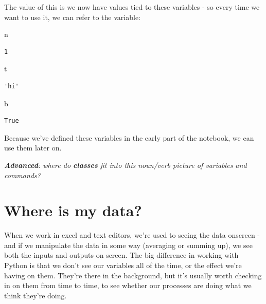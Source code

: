 \documentclass[
  letterpaper,
  DIV=11,
  numbers=noendperiod]{scrreprt}
\newenvironment{Shaded}{\begin{snugshade}}{\end{snugshade}}
\newcommand{\NormalTok}[1]{\textcolor[rgb]{0.00,0.23,0.31}{#1}}
\begin{document}
The value of this is we now have values tied to these variables - so
every time we want to use it, we can refer to the variable:

\begin{Shaded}
\begin{Highlighting}[]
\NormalTok{n}
\end{Highlighting}
\end{Shaded}

\begin{verbatim}
1
\end{verbatim}

\begin{Shaded}
\begin{Highlighting}[]
\NormalTok{t}
\end{Highlighting}
\end{Shaded}

\begin{verbatim}
'hi'
\end{verbatim}

\begin{Shaded}
\begin{Highlighting}[]
\NormalTok{b}
\end{Highlighting}
\end{Shaded}

\begin{verbatim}
True
\end{verbatim}

Because we've defined these variables in the early part of the notebook,
we can use them later on.

\emph{\textbf{Advanced}: where do \textbf{classes} fit into this
noun/verb picture of variables and commands?}

\hypertarget{where-is-my-data}{%
\section{Where is my data?}\label{where-is-my-data}}

When we work in excel and text editors, we're used to seeing the data
onscreen - and if we manipulate the data in some way (averaging or
summing up), we see both the inputs and outputs on screen. The big
difference in working with Python is that we don't see our variables all
of the time, or the effect we're having on them. They're there in the
background, but it's usually worth checking in on them from time to
time, to see whether our processes are doing what we think they're
doing.
\end{document}
